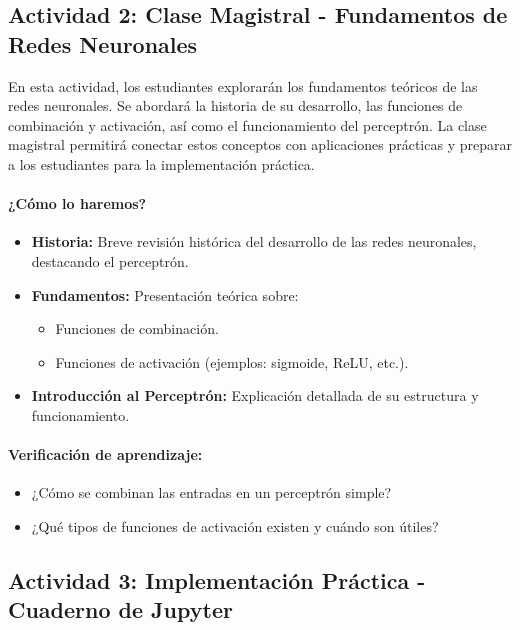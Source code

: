\documentclass[a4,11pt]{aleph-notas}
\begin{document}
\subsection*{Actividad 2: Clase Magistral - Fundamentos de Redes Neuronales}

En esta actividad, los estudiantes explorarán los fundamentos teóricos de las redes neuronales. Se abordará la historia de su desarrollo, las funciones de combinación y activación, así como el funcionamiento del perceptrón. La clase magistral permitirá conectar estos conceptos con aplicaciones prácticas y preparar a los estudiantes para la implementación práctica.

\paragraph{¿Cómo lo haremos?}  
\begin{itemize}[leftmargin=*]
    \item \textbf{Historia:} Breve revisión histórica del desarrollo de las redes neuronales, destacando el perceptrón.
    \item \textbf{Fundamentos:} Presentación teórica sobre:
    \begin{itemize}
        \item Funciones de combinación.
        \item Funciones de activación (ejemplos: sigmoide, ReLU, etc.).
    \end{itemize}
    \item \textbf{Introducción al Perceptrón:} Explicación detallada de su estructura y funcionamiento.
\end{itemize}

\paragraph{Verificación de aprendizaje:}  
\begin{itemize}[leftmargin=*]
    \item ¿Cómo se combinan las entradas en un perceptrón simple?
    \item ¿Qué tipos de funciones de activación existen y cuándo son útiles?
\end{itemize}

\subsection*{Actividad 3: Implementación Práctica - Cuaderno de Jupyter}
\end{document}
